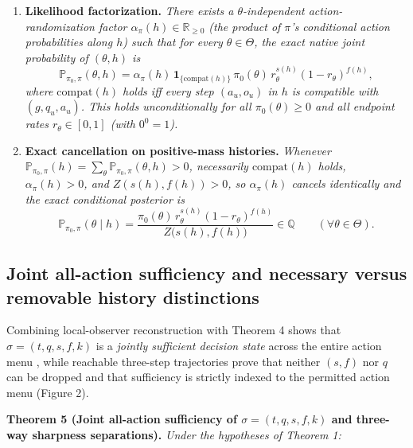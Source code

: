 \documentclass[11pt,a4paper]{article}
\providecommand{\tightlist}{\setlength{\itemsep}{2pt}\setlength{\parskip}{0pt}}
\begin{document}
\begin{enumerate}
\def\labelenumi{\arabic{enumi}.}
\tightlist
\item
  \textbf{Likelihood factorization.} \emph{There exists a
  \(\theta\)-independent action-randomization factor
  \(\alpha_\pi(h) \in \mathbb{R}_{\ge 0}\) (the product of \(\pi\)'s
  conditional action probabilities along \(h\)) such that for every
  \(\theta \in \Theta\), the exact native joint probability of
  \((\theta, h)\) is}
  \[\mathbb{P}_{\pi_0, \pi}(\theta, h) = \alpha_\pi(h)\,\mathbf{1}_{\{\mathrm{compat}(h)\}}\, \pi_0(\theta)\, r_\theta^{s(h)} (1 - r_\theta)^{f(h)},\]
  \emph{where \(\mathrm{compat}(h)\) holds iff every step \((a_u, o_u)\)
  in \(h\) is compatible with \((g, q_u, a_u)\). This holds
  unconditionally for all \(\pi_0(\theta) \ge 0\) and all endpoint rates
  \(r_\theta \in [0,1]\) (with \(0^0 = 1\)).}
\item
  \textbf{Exact cancellation on positive-mass histories.} \emph{Whenever
  \(\mathbb{P}_{\pi_0, \pi}(h) = \sum_\theta \mathbb{P}_{\pi_0, \pi}(\theta, h) > 0\),
  necessarily \(\mathrm{compat}(h)\) holds, \(\alpha_\pi(h) > 0\), and
  \(Z(s(h), f(h)) > 0\), so \(\alpha_\pi(h)\) cancels identically and
  the exact conditional posterior is}
  \[\mathbb{P}_{\pi_0, \pi}(\theta \mid h) = \frac{\pi_0(\theta)\, r_\theta^{s(h)} (1 - r_\theta)^{f(h)}}{Z\bigl(s(h), f(h)\bigr)} \in \mathbb{Q} \qquad (\forall \theta \in \Theta).\]
\end{enumerate}

\subsection{Joint all-action sufficiency and necessary versus removable
history
distinctions}\label{joint-all-action-sufficiency-and-necessary-versus-removable-history-distinctions}

Combining local-observer reconstruction with Theorem 4 shows that
\(\sigma = (t, q, s, f, k)\) is a \emph{jointly sufficient decision
state} across the entire action menu
\citep{striebel1965, burkeRosenblatt1958, kemenySnell1960, givanDeanGreig2003},
while reachable three-step trajectories prove that neither \((s,f)\) nor
\(q\) can be dropped and that sufficiency is strictly indexed to the
permitted action menu (Figure 2).

\textbf{Theorem 5 (Joint all-action sufficiency of
\(\sigma = (t, q, s, f, k)\) and three-way sharpness separations).}
\emph{Under the hypotheses of Theorem 1:}
\end{document}
